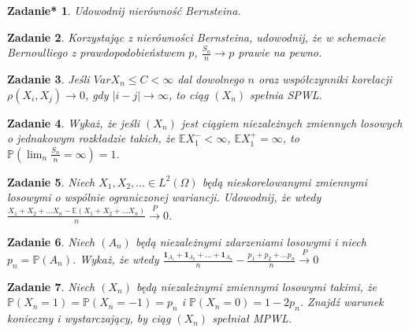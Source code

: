 \documentclass{mwart}
\newtheorem{zd}{Zadanie}
\newtheorem{zdt}[zd]{Zadanie*}
\begin{document}
\begin{zdt}
Udowodnij nierówność Bernsteina.
\end{zdt}

\begin{zd}
Korzystając z nierówności Bernsteina, udowodnij, że w schemacie Bernoulliego z prawdopodobieństwem $p$, $\frac{S_n}{n}\to p$ prawie na pewno.
\end{zd}

\begin{zd}
Jeśli $VarX_n \leq C < \infty$ dal dowolnego $n$ oraz współczynniki korelacji $\rho (X_i, X_j) \to 0$, gdy $|i-j|\to \infty$, to ciąg $(X_n)$ spełnia SPWL.
\end{zd}

\begin{zd}
Wykaż, że jeśli $(X_n)$ jest ciągiem niezależnych zmiennych losowych o jednakowym rozkładzie takich, że $\mathbb{E}X_1^- < \infty$, $\mathbb{E}X_1^+ = \infty$, to $\mathbb{P}\left(\lim_n\frac{S_n}{n} = \infty\right) = 1$.
\end{zd}

\begin{zd}
Niech $X_1, X_2, \dots \in L^2\left(\Omega \right)$ będą nieskorelowanymi zmiennymi losowymi o wspólnie ograniczonej wariancji. Udowodnij, że wtedy $\frac{X_1+X_2 + \dots  X_n - \mathbb{E}\left(X_1+X_2 + \dots  X_n\right)}{n} \xrightarrow{P} 0$.
\end{zd}

\begin{zd}
Niech $(A_n)$ będą niezależnymi zdarzeniami losowymi i niech $p_n = \mathbb{P}(A_n)$. Wykaż, że wtedy $\frac{\pmb{1}_{A_1} + \pmb{1}_{A_2} + \dots + \pmb{1}_{A_n}}{n} - \frac{p_1 + p_2 + \dots p_n}{n} \xrightarrow{P} 0$
\end{zd}

\begin{zd}
Niech $(X_n)$ będą niezależnymi zmiennymi losowymi takimi, że $\mathbb{P}(X_n=1)=\mathbb{P}(X_n=-1) = p_n$ i $\mathbb{P}(X_n=0)=1-2p_n$. Znajdź warunek konieczny i wystarczający, by ciąg $(X_n)$ spełniał MPWL.
\end{zd}
\end{document}
